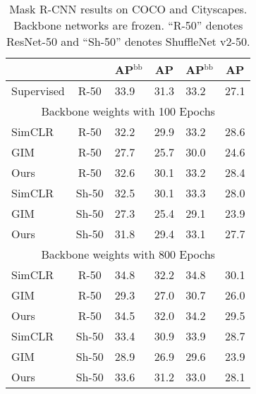 \begin{table}
\begin{minipage}[t]{0.55\linewidth}
{\begin{tabular}{lc|ll|ll}
     ~ & ~ & \multicolumn{1}{c}{AP$^\text{bb}$} & \multicolumn{1}{c|}{AP} & \multicolumn{1}{c}{AP$^\text{bb}$} & \multicolumn{1}{c}{AP}  \\
     \midrule
     Supervised		& R-50			& 33.9  	& 31.3	& 33.2 & 27.1\\
     \midrule
     \multicolumn{6}{c}{Backbone weights with 100 Epochs}\\
     \midrule
     SimCLR 		& R-50 			& 32.2  	& 29.9 	& 33.2 & 28.6\\
     GIM            & R-50 			& 27.7 \color{red}{(-4.5)}	& 25.7 \color{red}{(-4.2)}	& 30.0 \color{red}{(-3.2)} & 24.6 \color{red}{(-4.0)}\\
     Ours     		& R-50 			& 32.6 \color{black}{(+0.4)}	& 30.1 \color{black}{(+0.2)}	& 33.2 \color{black}{(+0.0)} & 28.4 \color{black}{(-0.2)}\\
     \midrule
     SimCLR 		& Sh-50 	& 32.5 	& 30.1	& 33.3 & 28.0\\
     GIM            & Sh-50 	& 27.3 \color{red}{(-5.2)}  	& 25.4 \color{red}{(-4.7)}	& 29.1 \color{red}{(-4.2)} & 23.9 \color{red}{(-4.1)}\\
     Ours     		& Sh-50 	& 31.8 \color{black}{(-0.7)}  	& 29.4 \color{black}{(-0.7)} 	& 33.1 \color{black}{(-0.2)} & 27.7 \color{black}{(-0.3)}\\
     \midrule
     \multicolumn{6}{c}{Backbone weights with 800 Epochs}\\
     \midrule
     SimCLR 		& R-50 			& 34.8  	& 32.2 	& 34.8 & 30.1 \\
     GIM            & R-50 			& 29.3 \color{red}{(-5.5)}	& 27.0 \color{red}{(-5.2)}	& 30.7 \color{red}{(-4.1)} & 26.0 \color{red}{(-4.1)} \\
     Ours     		& R-50 			& 34.5 \color{black}{(-0.3)}	& 32.0 \color{black}{(-0.2)}	& 34.2 \color{black}{(-0.6)} & 29.5 \color{black}{(-0.6)} \\
     \midrule
     SimCLR 		& Sh-50 	& 33.4 	& 30.9	& 33.9 & 28.7 \\
     GIM            & Sh-50 	& 28.9 \color{red}{(-4.5)}  	& 26.9 \color{red}{(-4.0)}	& 29.6 \color{red}{(-4.3)} & 23.9 \color{red}{(-4.8)} \\
     Ours     		& Sh-50 	& 33.6 \color{black}{(+0.2)} 	& 31.2 \color{black}{(+0.3)}	& 33.0 \color{black}{(-0.9)} & 28.1 \color{black}{(-0.6)} \\ \bottomrule
\end{tabular}	
}
\caption{Mask R-CNN results on COCO and Cityscapes. Backbone networks are frozen. ``R-50'' denotes
ResNet-50 and ``Sh-50'' denotes ShuffleNet v2-50.}
\label{tab:det_results}	
\end{minipage}
\vspace{-0.2in}
\end{table}

